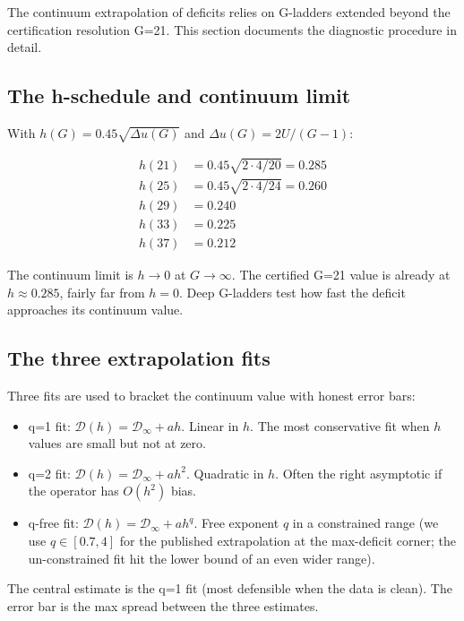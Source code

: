 \documentclass[11pt]{article}
\newcommand{\1}{\mathbf{1}}
\newcommand{\deficit}{\mathcal{D}}
\begin{document}
The continuum extrapolation of deficits relies on G-ladders extended
beyond the certification resolution G=21.  This section documents the
diagnostic procedure in detail.

\subsection{The h-schedule and continuum limit}

With $h(G) = 0.45 \sqrt{\Delta u(G)}$ and $\Delta u(G) = 2U/(G-1)$:

\begin{align}
h(21) &= 0.45 \sqrt{2 \cdot 4 / 20} = 0.285 \\
h(25) &= 0.45 \sqrt{2 \cdot 4 / 24} = 0.260 \\
h(29) &= 0.240 \\
h(33) &= 0.225 \\
h(37) &= 0.212
\end{align}

The continuum limit is $h \to 0$ at $G \to \infty$.  The certified G=21
value is already at $h \approx 0.285$, fairly far from $h = 0$.  Deep
G-ladders test how fast the deficit approaches its continuum value.

\subsection{The three extrapolation fits}

Three fits are used to bracket the continuum value with honest error
bars:

\begin{itemize}
\item q=1 fit: $\deficit(h) = \deficit_\infty + a h$. Linear in $h$.
The most conservative fit when $h$ values are small but not at zero.
\item q=2 fit: $\deficit(h) = \deficit_\infty + a h^2$. Quadratic in $h$.
Often the right asymptotic if the operator has $O(h^2)$ bias.
\item q-free fit: $\deficit(h) = \deficit_\infty + a h^q$. Free exponent
$q$ in a constrained range (we use $q \in [0.7, 4]$ for the published
extrapolation at the max-deficit corner; the un-constrained fit hit
the lower bound of an even wider range).
\end{itemize}

The central estimate is the q=1 fit (most defensible when the data is
clean).  The error bar is the max spread between the three estimates.
\end{document}
